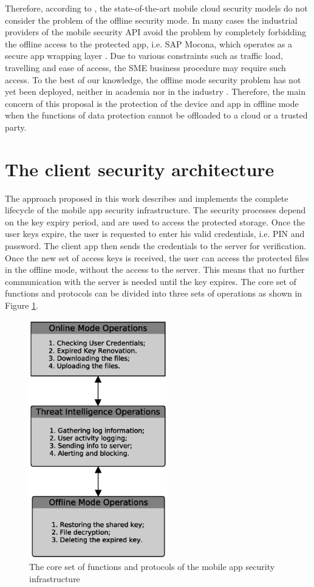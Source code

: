\documentclass[twocolumn]{svjour3}          %
\begin{document}
Therefore, according to \cite{khan2015cloud, tenorio2013greatest, khan2013towards}, the state-of-the-art mobile cloud security models do not consider the problem of the offline security mode. In many cases the industrial providers of the mobile security API avoid the problem by completely forbidding the offline access to the protected app, i.e. SAP Mocona, which operates as a secure app wrapping layer \cite{Lelyveld2013}. Due to various constraints such as traffic load, travelling and ease of access, the SME business procedure may require such access. To the best of our knowledge, the offline mode security problem has not yet been deployed, neither in academia nor in the industry \cite{yovel2014, khan2015cloud, khan2014survey, khan2013towards}. Therefore, the main concern of this proposal is the protection of the device and app in offline mode when the functions of data protection cannot be offloaded to a cloud or a trusted party. 

\section{The client security architecture}
\label{sec_the_client_security_architecture}
The approach proposed in this work describes and implements the complete lifecycle of the mobile app security infrastructure. The security processes depend on the key expiry period, and are used to access the protected storage. Once the user keys expire, the user is requested to enter his valid credentials, i.e. PIN and password. The client app then sends the credentials to the server for verification. Once the new set of access keys is received, the user can access the protected files in the offline mode, without the access to the server. This means that no further communication with the server is needed until the key expires. The core set of functions and protocols can be divided into three sets of operations as shown in Figure \ref{fig:1}.

\begin{figure}[h!]
	\centering
	\includegraphics[width=6cm]{figures/coresetoffunctionsandprotocols.eps}
	\caption{The core set of functions and protocols of the mobile app security infrastructure}
	\label{fig:1}
\end{figure}
\end{document}
